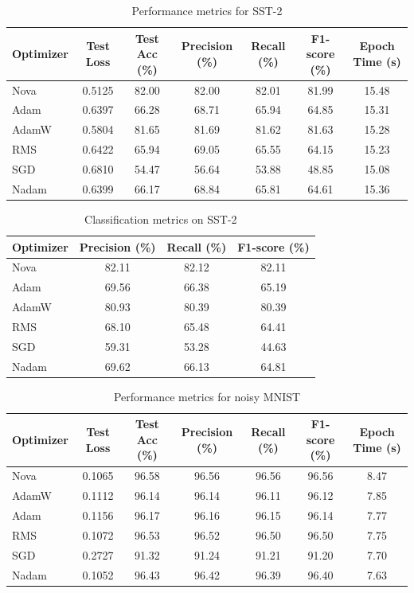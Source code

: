 \documentclass{article}
\begin{document}
\begin{table}[H]
\centering
\caption{Performance metrics for SST-2}
\begin{tabular}{lcccccc}\toprule
Optimizer & Test Loss & Test Acc (\%) & Precision (\%) & Recall (\%) & F1-score (\%) & Epoch Time (s) \\ \midrule
Nova & 0.5125 & 82.00 & 82.00 & 82.01 & 81.99 & 15.48 \\
Adam & 0.6397 & 66.28 & 68.71 & 65.94 & 64.85 & 15.31 \\
AdamW & 0.5804 & 81.65 & 81.69 & 81.62 & 81.63 & 15.28 \\
RMS & 0.6422 & 65.94 & 69.05 & 65.55 & 64.15 & 15.23 \\
SGD & 0.6810 & 54.47 & 56.64 & 53.88 & 48.85 & 15.08 \\
Nadam & 0.6399 & 66.17 & 68.84 & 65.81 & 64.61 & 15.36 \\
\bottomrule
\end{tabular}
\label{tab:sst-2_main}
\end{table}


 \begin{table}[H]
\centering
\caption{Classification metrics on SST-2}
\begin{tabular}{lccc}
\toprule
Optimizer & Precision (\%) & Recall (\%) & F1-score (\%) \\
\midrule
Nova & 82.11 & 82.12 & 82.11  \\
Adam & 69.56 & 66.38 & 65.19  \\
AdamW & 80.93 & 80.39 & 80.39  \\
RMS & 68.10 & 65.48 & 64.41 \\
SGD & 59.31 & 53.28 & 44.63  \\
Nadam & 69.62 & 66.13 & 64.81  \\
\bottomrule
\end{tabular}
\label{tab:sst-2_prf}
\end{table}












\begin{table}[H]
\centering
\caption{Performance metrics for noisy MNIST}
\begin{tabular}{lcccccc}\toprule
Optimizer & Test Loss & Test Acc (\%) & Precision (\%) & Recall (\%) & F1-score (\%) & Epoch Time (s) \\ \midrule
Nova & 0.1065 & 96.58 & 96.56 & 96.56 & 96.56 & 8.47 \\
AdamW & 0.1112 & 96.14 & 96.14 & 96.11 & 96.12 & 7.85 \\
Adam & 0.1156 & 96.17 & 96.16 & 96.15 & 96.14 & 7.77 \\
RMS & 0.1072 & 96.53 & 96.52 & 96.50 & 96.50 & 7.75 \\
SGD & 0.2727 & 91.32 & 91.24 & 91.21 & 91.20 & 7.70 \\
Nadam & 0.1052 & 96.43 & 96.42 & 96.39 & 96.40 & 7.63 \\
\bottomrule
\end{tabular}
\label{tab:mnist_noisy_main}
\end{table}
\end{document}
